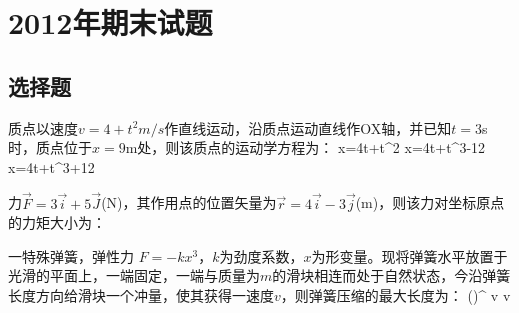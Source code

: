 \chapter{2012年期末试题}
\section{选择题}
质点以速度$v=4+t^2 m/s$作直线运动，沿质点运动直线作OX轴，并已知$t=3$s时，质点位于$x=9$m处，则该质点的运动学方程为：
{x=4t+t^2}
{x=4t+t^3-12}
{x=4t+t^3+12}

力$\vec{F}=3\vec{i}+5\vec{J}$(N)，其作用点的位置矢量为$\vec{r}=4\vec{i}-3\vec{j}$(m)，则该力对坐标原点
的力矩大小为：

一特殊弹簧，弹性力 $F=-kx^3$，$k$为劲度系数，$x$为形变量。现将弹簧水平放置于光滑的平面上，一端固定，一端与质量为$m$的滑块相连而处于自然状态，今沿弹簧长度方向给滑块一个冲量，使其获得一速度$v$，则弹簧压缩的最大长度为：
{{\left(\right)}^{}}
{v}
{v}

